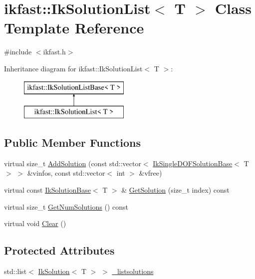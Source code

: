 \hypertarget{classikfast_1_1IkSolutionList}{\section{ikfast\-:\-:Ik\-Solution\-List$<$ T $>$ Class Template Reference}
\label{classikfast_1_1IkSolutionList}
}


{\ttfamily \#include $<$ikfast.\-h$>$}

Inheritance diagram for ikfast\-:\-:Ik\-Solution\-List$<$ T $>$\-:\begin{figure}[H]
\begin{center}
\leavevmode
\includegraphics[height=2.000000cm]{classikfast_1_1IkSolutionList}
\end{center}
\end{figure}
\subsection*{Public Member Functions}
\begin{DoxyCompactItemize}
\item 
virtual size\-\_\-t \hyperlink{classikfast_1_1IkSolutionList_ac0a503b13e68403e7b2d92afd4c28a7b}{Add\-Solution} (const std\-::vector$<$ \hyperlink{classikfast_1_1IkSingleDOFSolutionBase}{Ik\-Single\-D\-O\-F\-Solution\-Base}$<$ T $>$ $>$ \&vinfos, const std\-::vector$<$ int $>$ \&vfree)
\item 
virtual const \hyperlink{classikfast_1_1IkSolutionBase}{Ik\-Solution\-Base}$<$ T $>$ \& \hyperlink{classikfast_1_1IkSolutionList_ab2840cca4cea5547d684907047d38bba}{Get\-Solution} (size\-\_\-t index) const 
\item 
virtual size\-\_\-t \hyperlink{classikfast_1_1IkSolutionList_a4508235ea7738ee067d6525a34362567}{Get\-Num\-Solutions} () const 
\item 
virtual void \hyperlink{classikfast_1_1IkSolutionList_ae341a33d5aee644cac867e3edd2a9916}{Clear} ()
\end{DoxyCompactItemize}
\subsection*{Protected Attributes}
\begin{DoxyCompactItemize}
\item 
std\-::list$<$ \hyperlink{classikfast_1_1IkSolution}{Ik\-Solution}$<$ T $>$ $>$ \hyperlink{classikfast_1_1IkSolutionList_a141004e6be454a5b9ab537d102c7f405}{\-\_\-listsolutions}
\end{DoxyCompactItemize}


